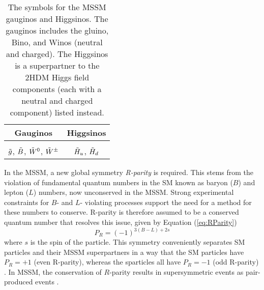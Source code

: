 \begin{table}[htbp]
    \centering
    \begin{tabular}{c|c}
    \toprule
       Gauginos  & Higgsinos \\
       \midrule
        & \\[-2.5ex]
      $\Tilde{g}$, $\Tilde{B}$, $\Tilde{W}^0$, $\Tilde{W}^\pm$ & $\Tilde{H}_u$,  $\Tilde{H}_d$ \\
     \bottomrule
    \end{tabular}
    \caption{The symbols for the MSSM gauginos and Higgsinos. The gauginos includes the gluino, Bino, and Winos (neutral and charged). The Higgsinos is a superpartner to the 2HDM Higgs  field components (each with a neutral and charged component) listed instead.}
    \label{tab:SUSYinos}
\end{table}
In the MSSM, a new global symmetry \textit{R-parity} is required. This stems from the violation of fundamental quantum numbers in the SM known as baryon ($B$) and lepton ($L$) numbers, now unconserved in the MSSM. Strong experimental constraints for $B$- and $L$- violating processes support the need for a method for these numbers to conserve. R-parity is therefore assumed to be a conserved quantum number that resolves this issue, given by Equation (\ref{eq:RParity})
\begin{equation}
    P_R=(-1)^{3(B-L)+2s}
    \label{eq:RParity}
\end{equation}
where $s$ is the spin of the particle. This symmetry conveniently separates SM particles and their MSSM superpartners in a way that the SM particles have $P_R=+1$ (even R-parity), whereas the sparticles all have $P_R=-1$ (odd R-parity) \cite{martin1997supersymmetry}. In MSSM, the conservation of $R$-parity results in supersymmetric events as pair-produced events \cite{aitchison2007supersymmetry}. \\

